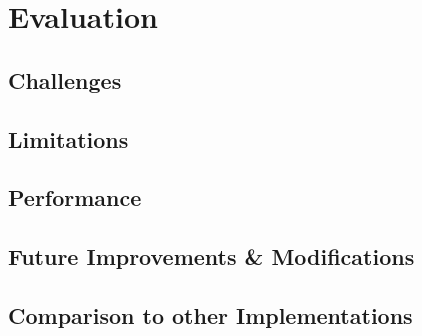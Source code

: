\chapter{Evaluation}
\section{Challenges}

\section{Limitations}

\section{Performance}

\section{Future Improvements \& Modifications}

\section{Comparison to other Implementations}

